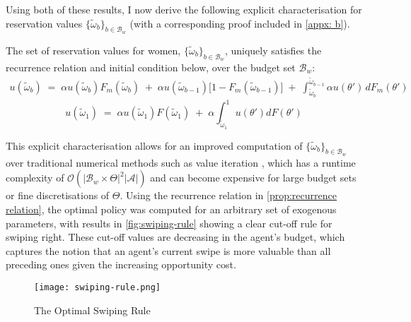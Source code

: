 Using both of these results, I now derive the following explicit characterisation for reservation values $\{\widetilde\omega_b\}_{b\in \mathcal{B}_w}$ (with a corresponding proof included in \autoref{appx: b}). 
\begin{proposition}\label{prop:recurrence relation}
The set of reservation values for women, $\{\widetilde\omega_b\}_{b\in \mathcal{B}_w}$, uniquely satisfies the recurrence relation and initial condition below, over the budget set $\mathcal{B}_w$: 
\begin{equation}\label{eq:recurrence relation}
    \begin{aligned}
        u(\widetilde \omega_b) \;=\; \alpha u(\widetilde \omega_b) F_m(\widetilde \omega_b) \;+\; \alpha u(\widetilde \omega_{b-1}) \Big[1- F_m(\widetilde \omega_{b-1})\Big] \;+\; \int^{\widetilde \omega_{b-1}}_{\widetilde \omega_b} \alpha u(\theta')\,dF_m(\theta')
    \end{aligned} 
\end{equation}  
\begin{equation}\label{eq:initial condition}
    u(\widetilde\omega_1) \;=\; \alpha u(\widetilde\omega_1)F(\widetilde\omega_1) \;+\; \alpha \int^1_{\widetilde\omega_1}u(\theta')dF(\theta')
\end{equation}
\end{proposition}  

This explicit characterisation allows for an improved computation of $\{\widetilde\omega_b\}_{b\in \mathcal{B}_w}$ over traditional numerical methods such as value iteration \cite{bellman2015applied}, which has a runtime complexity of $\mathcal{O}(|\mathcal{B}_w\times\Theta|^2|\mathcal{A}|)$ and can become expensive for large budget sets or fine discretisations of $\Theta$. Using the recurrence relation in \autoref{prop:recurrence relation}, the optimal policy was computed for an arbitrary set of exogenous parameters, with results in \autoref{fig:swiping-rule} showing a clear cut-off rule for swiping right. 
These cut-off values are decreasing in the agent's budget, which captures the notion that an agent's current swipe is more valuable than all preceding ones given the increasing opportunity cost.

\begin{figure}[ht]
    \centering
    \caption{The Optimal Swiping Rule}
    \texttt{[image: swiping-rule.png]}
    \label{fig:swiping-rule} 
\end{figure} 
